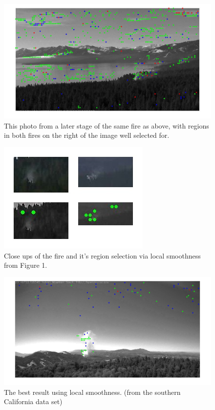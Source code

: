 \documentclass[12pt]{article}
\begin{document}
\begin{figure}[H]
\centering
\includegraphics[scale=.2]{LSTahoeEasy.jpg}
\caption{This photo from a later stage of the same fire as above, with regions in both fires on the right of the image well selected for.}

\end{figure}
\begin{figure}[H]
\centering
\includegraphics[scale=.5]{lsHardcombined.jpg}
\caption{Close ups of the fire and it's region selection via local smoothness from Figure 1. }
\end{figure}

\begin{figure}[H]
\centering
\includegraphics[scale=.2]{smoothGREAT.jpg}
\caption{The best result using local smoothness. (from the southern California data set)}
\end{figure}
\end{document}
